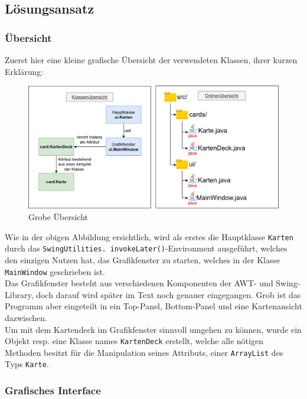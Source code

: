 \documentclass[a4paper,11pt]{article}
\begin{document}
\subsection{Lösungsansatz}

\subsubsection{Übersicht}

Zuerst hier eine kleine grafische Übersicht der verwendeten Klassen, ihrer kurzen Erklärung:

\begin{figure}[H]
    \centering
    \includegraphics[width=\textwidth]{media/class-overview.png}
    \caption{Grobe Übersicht}
\end{figure}

Wie in der obigen Abbildung ersichtlich, wird als erstes die Hauptklasse \texttt{Karten} durch das \texttt{SwingUtilities.
invokeLater()}-Environment ausgeführt, welches den einzigen Nutzen hat, das Grafikfenster zu starten, welches in der Klasse \texttt{MainWindow} geschrieben ist.\\

Das Grafikfenster besteht aus verschiedenen Komponenten der AWT- und Swing-Library, doch darauf wird später im Text noch genauer eingegangen. Grob ist das Programm aber eingeteilt in ein Top-Panel, Bottom-Panel und eine Kartenansicht dazwischen.\\

Um mit dem Kartendeck im Grafikfenster sinnvoll umgehen zu können, wurde ein Objekt resp. eine Klasse names \texttt{KartenDeck} erstellt, welche alle nötigen Methoden besitzt für die Manipulation seines Attributs, einer \texttt{ArrayList} des Typs \texttt{Karte}.

\subsubsection{Grafisches Interface}
\end{document}

